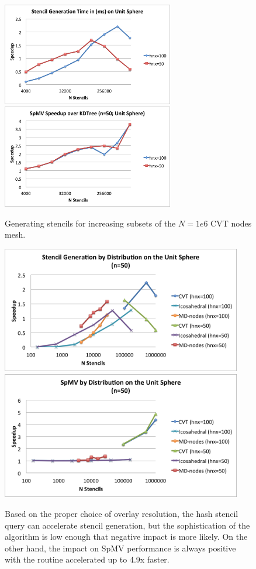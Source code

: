 \documentclass[11pt]{report}
\begin{document}
\begin{figure}
\centering
\includegraphics[width=7.5cm]{../figures/stencils/sphere_subsets_1m_stencil_gen_speedup.png}
\includegraphics[width=7.5cm]{../figures/stencils/sphere_subsets_1m_spmv_speedup.png}
\caption{Generating stencils for increasing subsets of the $N=1e6$ CVT nodes mesh.}
\label{fig:hash_results}
\end{figure}
\begin{figure}
\centering
\includegraphics[width=10.5cm]{../figures/stencils/sphere_stencil_gen_speedup.png}
\includegraphics[width=10.5cm]{../figures/stencils/sphere_spmv_speedup.png} 
\caption{Based on the proper choice of overlay resolution, the hash stencil query can accelerate stencil generation, but the sophistication of the algorithm is low enough that negative impact is more likely. On the other hand, the impact on SpMV performance is always positive with the routine accelerated up to 4.9x faster.}
\label{fig:hash_results}
\end{figure}
\end{document}
